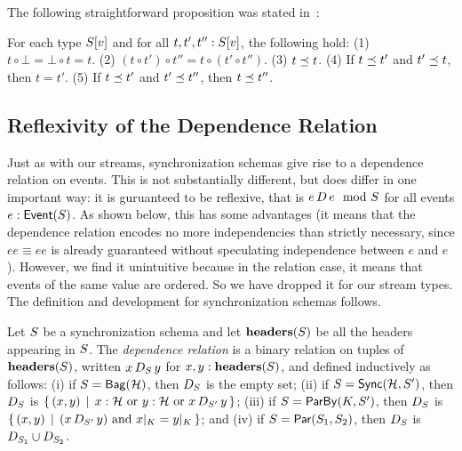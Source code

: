 The following straightforward proposition was stated in~:

\begin{proposition}
\label{45:prop:sps-concat-properties}
For each type $\spstype{v}{\ss}$ and for all $t, t', t'': \spstype{v}{\ss}$,
the following hold:
(1) $t \circ \bot = \bot \circ t = t$.
(2) $(t \circ t') \circ t'' = t \circ (t' \circ t'')$.
(3) $t \prefix t$.
(4) If $t \prefix t'$ and $t' \prefix t$, then $t = t'$.
(5) If $t \prefix t'$ and $t' \prefix t''$, then $t \prefix t''$.
\end{proposition}

\subsection{Reflexivity of the Dependence Relation}

Just as with our streams, synchronization schemas give rise to a dependence relation on events.
This is not substantially different, but does differ in one important way: it is guruanteed to be reflexive, that is $\deptype{e}{e}{S}$ for all events $\eventtype{e}{S}$.
As shown below, this has some advantages (it means that the dependence relation encodes no more independencies than strictly necessary, since $ee \equiv ee$ is already guaranteed without speculating independence between $e$ and $e$).
However, we find it unintuitive because in the relation case, it means that events of the same value are ordered. So we have dropped it for our stream types.
The definition and development for synchronization schemas follows.

\begin{definition}
\label{45:def:dep-relation}
Let $\ss$ be a synchronization schema and let $\headers(\ss)$ be all the headers appearing in $\ss$.
The \emph{dependence relation} is a binary relation on tuples of $\headers(\ss)$, written $x\, D_{\ss}\, y$ for $x, y: \headers(\ss)$, and defined inductively as follows:
(i) if $\ss = \relleaf{\mathcal{H}}$, then $D_{\ss}$ is the empty set;
(ii) if $\ss = \hier{\mathcal{H}}{\ss'}$, then
$D_{\ss}$ is $\{\, (x, y)\,\mid\,
    x : \mathcal{H}
    \text{ or } y : \mathcal{H}
    \text{ or } x\, D_{\ss'}\, y\,\}$;
(iii) if $\ss = \keyby{K}{\ss'}$, then
$D_{\ss}$ is $\{\, (x, y) \,\mid\,
    (x\, D_{\ss'}\, y) \text{ and } \tuprestrict{x}{K} = \tuprestrict{y}{K}\,\}$; and
(iv) if $\ss = \parcomp{\ss_1}{\ss_2}$, then
$D_{\ss}$ is $D_{\ss_1} \cup D_{\ss_2}$.
\end{definition}

